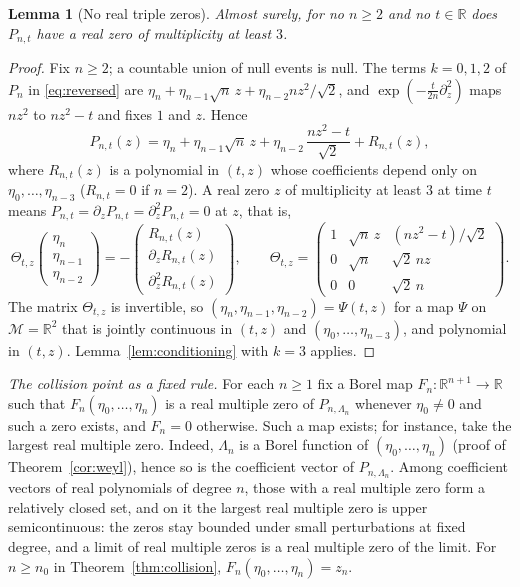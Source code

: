 \documentclass[11pt]{amsart}
\newtheorem{lemma}[theorem]{Lemma}
\theoremstyle{definition}
\theoremstyle{remark}
\numberwithin{equation}{section}
\newcommand{\R}{\mathbb{R}}
\begin{document}
\begin{lemma}[No real triple zeros]\label{lem:notriple}
Almost surely, for no $n\ge2$ and no $t\in\R$ does $P_{n,t}$ have a real zero of multiplicity at least $3$.
\end{lemma}

\begin{proof}
Fix $n\ge2$; a countable union of null events is null. The terms $k=0,1,2$ of $P_n$ in \eqref{eq:reversed} are $\eta_n+\eta_{n-1}\sqrt n\,z+\eta_{n-2}nz^2/\sqrt2$, and $\exp(-\frac t{2n}\partial_z^2)$ maps $nz^2$ to $nz^2-t$ and fixes $1$ and $z$. Hence
\[
P_{n,t}(z)=\eta_n+\eta_{n-1}\sqrt n\,z+\eta_{n-2}\,\frac{nz^2-t}{\sqrt2}+R_{n,t}(z),
\]
where $R_{n,t}(z)$ is a polynomial in $(t,z)$ whose coefficients depend only on $\eta_0,\dots,\eta_{n-3}$ ($R_{n,t}=0$ if $n=2$). A real zero $z$ of multiplicity at least $3$ at time $t$ means $P_{n,t}=\partial_zP_{n,t}=\partial_z^2P_{n,t}=0$ at $z$, that is,
\[
\Theta_{t,z}\begin{pmatrix}\eta_n\\\eta_{n-1}\\\eta_{n-2}\end{pmatrix}=-\begin{pmatrix}R_{n,t}(z)\\\partial_zR_{n,t}(z)\\\partial_z^2R_{n,t}(z)\end{pmatrix},\qquad\Theta_{t,z}=\begin{pmatrix}1&\sqrt n\,z&(nz^2-t)/\sqrt2\\0&\sqrt n&\sqrt2\,nz\\0&0&\sqrt2\,n\end{pmatrix}.
\]
The matrix $\Theta_{t,z}$ is invertible, so $(\eta_n,\eta_{n-1},\eta_{n-2})=\Psi(t,z)$ for a map $\Psi$ on $\mathcal M=\R^2$ that is jointly continuous in $(t,z)$ and $(\eta_0,\dots,\eta_{n-3})$, and polynomial in $(t,z)$. Lemma~\ref{lem:conditioning} with $k=3$ applies.
\end{proof}

\emph{The collision point as a fixed rule.} For each $n\ge1$ fix a Borel map $F_n:\R^{n+1}\to\R$ such that $F_n(\eta_0,\dots,\eta_n)$ is a real multiple zero of $P_{n,\Lambda_n}$ whenever $\eta_0\ne0$ and such a zero exists, and $F_n=0$ otherwise. Such a map exists; for instance, take the largest real multiple zero. Indeed, $\Lambda_n$ is a Borel function of $(\eta_0,\dots,\eta_n)$ (proof of Theorem~\ref{cor:weyl}), hence so is the coefficient vector of $P_{n,\Lambda_n}$. Among coefficient vectors of real polynomials of degree $n$, those with a real multiple zero form a relatively closed set, and on it the largest real multiple zero is upper semicontinuous: the zeros stay bounded under small perturbations at fixed degree, and a limit of real multiple zeros is a real multiple zero of the limit. For $n\ge n_0$ in Theorem~\ref{thm:collision}, $F_n(\eta_0,\dots,\eta_n)=z_n$.
\end{document}
